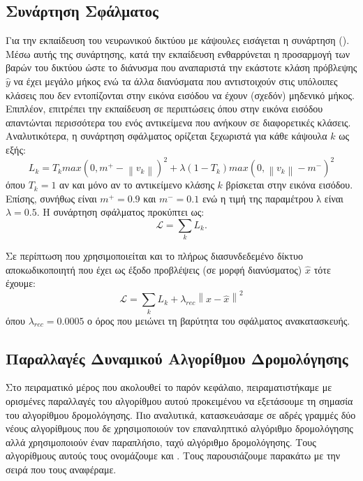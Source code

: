 \subsection{Συνάρτηση Σφάλματος}

Για την εκπαίδευση του νευρωνικού δικτύου με κάψουλες εισάγεται η συνάρτηση  (). Μέσω αυτής της συνάρτησης, κατά την εκπαίδευση ενθαρρύνεται η προσαρμογή των βαρών του δικτύου ώστε το διάνυσμα  που αναπαριστά την εκάστοτε κλάση πρόβλεψης $\hat{y}$ να έχει μεγάλο μήκος ενώ τα άλλα διανύσματα που αντιστοιχούν στις υπόλοιπες κλάσεις που δεν εντοπίζονται στην εικόνα εισόδου να έχουν (σχεδόν) μηδενικό μήκος. Επιπλέον, επιτρέπει την εκπαίδευση σε περιπτώσεις όπου στην εικόνα εισόδου απαντώνται περισσότερα του ενός αντικείμενα που ανήκουν σε διαφορετικές κλάσεις. Αναλυτικότερα, η συνάρτηση σφάλματος ορίζεται ξεχωριστά για κάθε κάψουλα  $k$ ως εξής:
\begin{equation}
    L_k = T_k max(0, m^+ - \left\lVert v_k\right\rVert)^2 + \lambda (1-T_k) max(0, \left\lVert v_k\right\rVert - m^-)^2
\end{equation}
όπου $T_k = 1$ αν και μόνο αν το αντικείμενο κλάσης $k$ βρίσκεται στην εικόνα εισόδου. Επίσης, συνήθως είναι $m^+ = 0.9$ και $m^- = 0.1$ ενώ η τιμή της παραμέτρου λ είναι $\lambda = 0.5$. Η συνάρτηση σφάλματος προκύπτει ως: \begin{equation}
  \mathcal{L} = \sum_k L_k.
\end{equation}

Σε περίπτωση που χρησιμοποιείται και το πλήρως διασυνδεδεμένο δίκτυο αποκωδικοποιητή που έχει ως έξοδο προβλέψεις (σε μορφή διανύσματος) $\hat{x}$ τότε έχουμε: 
\begin{equation}
\mathcal{L} = \sum_k L_k + \lambda_{rec} \left\lVert x - \hat{x}\right\rVert^2 
\end{equation}
όπου $\lambda_{rec} = 0.0005$ ο όρος που μειώνει τη βαρύτητα του σφάλματος ανακατασκευής.

\subsection{Παραλλαγές Δυναμικού Αλγορίθμου Δρομολόγησης}

Στο πειραματικό μέρος που ακολουθεί το παρόν κεφάλαιο, πειραματιστήκαμε με ορισμένες παραλλαγές του αλγορίθμου αυτού προκειμένου να εξετάσουμε τη σημασία του αλγορίθμου δρομολόγησης. Πιο αναλυτικά, κατασκευάσαμε σε αδρές γραμμές δύο νέους αλγορίθμους που δε χρησιμοποιούν τον επαναληπτικό αλγόριθμο δρομολόγησης αλλά χρησιμοποιούν έναν παραπλήσιο, ταχύ αλγόριθμο δρομολόγησης. Τους αλγορίθμους αυτούς τους ονομάζουμε  και . Τους παρουσιάζουμε παρακάτω με την σειρά που τους αναφέραμε.

